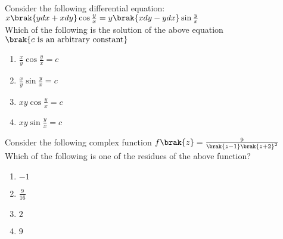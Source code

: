 \item{
Consider the following differential equation:$x\brak{ydx+xdy}\cos\frac{y}{x}=y\brak{xdy-ydx}\sin\frac{y}{x}$\\
Which of the following is the solution of the above equation $\brak{c\text{ is an arbitrary constant}}$
\begin{multicols}{4}
\begin{enumerate}
\item $\frac{x}{y}\cos\frac{y}{x}=c$
\item $\frac{x}{y}\sin\frac{y}{x}=c$
\item $xy\cos\frac{y}{x}=c$
\item $xy\sin\frac{y}{x}=c$
\end{enumerate}
\end{multicols}
}
\item{
Consider the following complex function $f\brak{z}=\frac{9}{\brak{z-1}\brak{z+2}^2}$ Which of the following is one of the residues of the above function?
\begin{multicols}{4}
    \begin{enumerate}
        \item $-1$
        \item $\frac{9}{16}$
        \item $2$
        \item $9$
    \end{enumerate}
\end{multicols}
}
